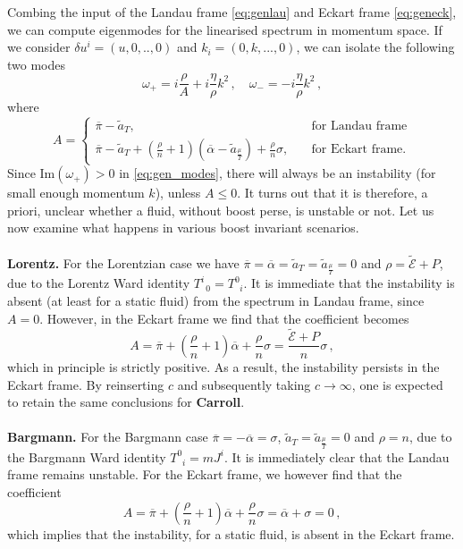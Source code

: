 \documentclass[superscriptaddress,prd,nofootinbib,preprintnumbers,longbibliography,11pt,eqsecnum]{revtex4-1}
\begin{document}
Combing the input of the Landau frame \eqref{eq:genlau} and Eckart frame \eqref{eq:geneck}, we can compute eigenmodes for the linearised spectrum in momentum space. If we consider $\delta u^{i}=(u,0,..,0)$ and $k_{i}=(0,k,...,0)$, we can isolate the following two modes
\begin{equation}\label{eq:gen_modes}
	\omega_{+}
=
	i\frac{\rho}{A}
	+
	i\frac{\eta}{\rho}k^{2}
	\,,
	\quad
	\omega_{-}
=
	-
	i
	\frac{\eta}{\rho}k^{2}
	\,,
\end{equation}
where 
\begin{equation}
    A = \left\{\begin{array}{lr}
        \overline{\pi}-\tilde{a}_{T}, &\quad\text{for Landau frame}\\
        \overline{\pi}-\tilde{a}_{T}+\left(\frac{\rho}{n}+1\right)(\overline{\alpha}-\tilde{a}_{\frac{\mu}{T}})+\frac{\rho}{n}\sigma, &\quad\text{for Eckart frame.}
        \end{array}\right.
\end{equation}
Since $\text{Im}(\omega_{+}) > 0$ in \eqref{eq:gen_modes}, there will always be an instability (for small enough momentum $k$), unless $A\leq0$. It turns out that it is therefore, a priori, unclear whether a fluid, without boost perse, is unstable or not.
 Let us now examine what happens in various boost invariant scenarios.
\\
\\
\textbf{Lorentz.} For the Lorentzian case we have $\overline{\pi}=\overline{\alpha}=\tilde{a}_{T}=\tilde{a}_{\frac{\mu}{T}}=0$ and $\rho=\tilde{\mathcal{E}}+P$, due to the Lorentz Ward identity $T^{i}_{\;\;0}=T^{0}_{\;\;i}$. It is immediate that the instability is absent (at least for a static fluid) from the spectrum in Landau frame, since $A=0$. However, in the Eckart frame we find that the coefficient becomes
\begin{equation}
			A
			=
				\overline{\pi}
			+
			\left(
			\frac{\rho}{n}+1
			\right)\overline{\alpha}
			+
			\frac{\rho}{n}\sigma
			=
			\frac{\tilde{\mathcal{E}}+P}{n}\sigma
			\,,
\end{equation}
which in principle is strictly positive. As a result, the instability persists in the Eckart frame. By reinserting $c$ and subsequently taking $c\to\infty$, one is expected to retain the same conclusions for \textbf{Carroll}. 
\\
\\
\textbf{Bargmann.} For the Bargmann case $\overline{\pi}=-\overline{\alpha}=\sigma$, $\tilde{a}_{T}=\tilde{a}_{\frac{\mu}{T}}=0$ and $\rho=n$, due to the Bargmann Ward identity $T^{0}_{\;\;i}=mJ^{i}$. It  is immediately clear that the Landau frame remains unstable. For the Eckart frame, we however find that the coefficient 
\begin{equation}
			A
			=
					\overline{\pi}
			+
			\left(
			\frac{\rho}{n}+1
			\right)\overline{\alpha}
			+
			\frac{\rho}{n}\sigma
			=
			\overline{\alpha}
			+
			\sigma
			=
			0
			\,,			
\end{equation}
which implies that the instability, for a static fluid, is absent in the Eckart frame.
\end{document}
